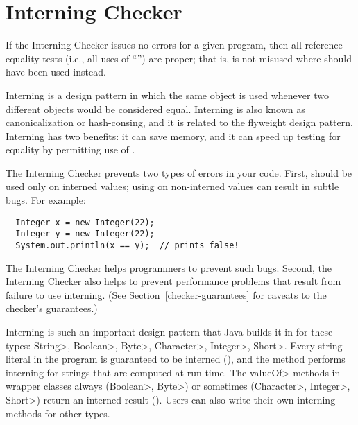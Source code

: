 \htmlhr
\chapter{Interning Checker\label{interning-checker}}


If the Interning Checker issues no errors for a given program, then all
reference equality tests (i.e., all uses of ``\code{==}'') are proper;
that is,
\code{==} is not misused where  should have been used instead.

Interning is a design pattern in which the same object is used whenever two
different objects would be considered equal.  Interning is also known as
canonicalization or hash-consing, and it is related to the flyweight design
pattern.
Interning has two benefits:  it can save memory, and it can speed up testing for
equality by permitting use of \code{==}.

The Interning Checker prevents two types of errors in your code.  First, 
\code{==} should be used
only on interned values; using \code{==} on
non-interned values can result in subtle bugs.  For example:

\begin{Verbatim}
  Integer x = new Integer(22);
  Integer y = new Integer(22);
  System.out.println(x == y);  // prints false!
\end{Verbatim}

\noindent
The Interning Checker helps programmers to prevent such bugs.
Second, 
the Interning Checker also helps to prevent performance problems that result
from failure to use interning.
(See Section~\ref{checker-guarantees} for caveats to the checker's guarantees.)

Interning is such an important design pattern that Java builds it in for
these types: \<String>, \<Boolean>, \<Byte>, \<Character>, \<Integer>,
\<Short>.  Every string literal in the program is guaranteed to be interned
(), and the
 method
performs interning for strings that are computed at run time.
The \<valueOf> methods in wrapper classes always (\<Boolean>, \<Byte>) or
sometimes (\<Character>, \<Integer>, \<Short>) return an interned result
().
Users can also write their own interning methods for other types.

